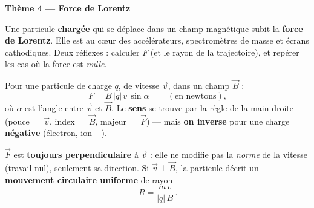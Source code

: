 \documentclass[11pt,a4paper]{article}
\newcommand{\vv}[1]{\vec{#1}}\newcommand{\ds}{\displaystyle}
\begin{document}
\begin{center}
{\Large\bfseries\color{primarydark} Thème 4 — Force de Lorentz}
\end{center}

\noindent Une particule \textbf{chargée} qui se déplace dans un champ magnétique subit la
\textbf{force de Lorentz}. Elle est au cœur des accélérateurs, spectromètres de masse et écrans
cathodiques. Deux réflexes : calculer $F$ (et le rayon de la trajectoire), et repérer les cas où la
force est \emph{nulle}.

\begin{cle}
Pour une particule de charge $q$, de vitesse $\vv{v}$, dans un champ $\vv{B}$ :
\[ \boxed{\,F = B\,|q|\,v\,\sin\alpha\,}\qquad(\text{en newtons}), \]
où $\alpha$ est l'angle entre $\vv{v}$ et $\vv{B}$. Le \textbf{sens} se trouve par la règle de la main
droite (pouce $=\vv{v}$, index $=\vv{B}$, majeur $=\vv{F}$) — mais \textbf{on inverse} pour une charge
\textbf{négative} (électron, ion $-$).
\end{cle}

\begin{cle}
$\vv{F}$ est \textbf{toujours perpendiculaire} à $\vv{v}$ : elle ne modifie pas la \emph{norme} de la
vitesse (travail nul), seulement sa direction. Si $\vv{v}\perp\vv{B}$, la particule décrit un
\textbf{mouvement circulaire uniforme} de rayon
\[ \boxed{\,R=\dfrac{m\,v}{|q|\,B}\,}. \]
\end{cle}

\begin{center}
\end{center}
\end{document}
